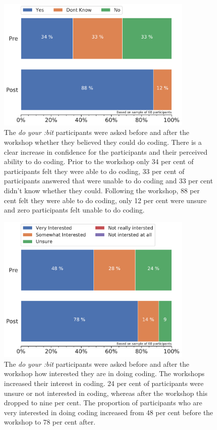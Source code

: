 \documentclass[12pt]{report} %
\newcommand{\DYB}{\textit{do your :bit }}
\begin{document}
\begin{figure}[t!]
    \centering
        \includegraphics[width=0.85\textwidth]{bar_candocoding}
\caption{The \DYB participants were asked before and after the workshop whether they believed they could do coding. There is a clear increase in confidence for the participants and their perceived ability to do coding. Prior to the workshop only 34 per cent of participants felt they were able to do coding, 33 per cent of participants answered that were unable to do coding and 33 per cent didn't know whether they could. Following the workshop, 88 per cent felt they were able to do coding, only 12 per cent were unsure and zero participants felt unable to do coding.} 
\label{fig:DYBcandocoding}
\end{figure}


\begin{figure}[t!]
    \centering
        \includegraphics[width=0.85\textwidth]{bar_codinginterest}
\caption{The \DYB participants were asked before and after the workshop how interested they are in doing coding. The workshops increased their interest in coding.  24 per cent of participants were unsure or not interested in coding, whereas after the workshop this dropped to nine per cent. The proportion of participants who are very interested in doing coding increased from 48 per cent before the workshop to 78 per cent after.}
\label{fig:DYBcodinginterest}
\end{figure}
\end{document}
